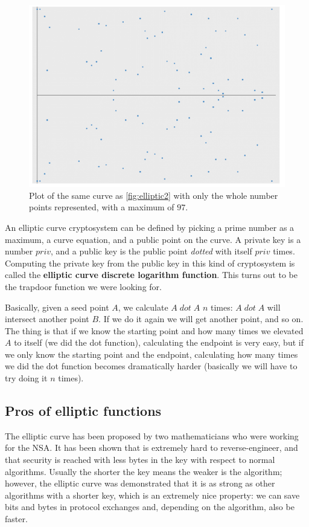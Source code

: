 \begin{figure}[H]
    \centering
    \includegraphics[scale=1]{img/elliptic3.png}
    \decoRule
    \caption{Plot of the same curve as \ref{fig:elliptic2} with only the whole number points represented, with a maximum of $97$.}
    \label{fig:elliptic3}
\end{figure}

An elliptic curve cryptosystem can be defined by picking a prime number as a maximum, a curve equation, and a public point on the curve. A private key is a number $priv$, and a public key is the public point \textit{dotted} with itself $priv$ times. Computing the private key from the public key in this kind of cryptosystem is called the \textbf{elliptic curve discrete logarithm function}. This turns out to be the trapdoor function we were looking for.

Basically, given a seed point $A$, we calculate $A\; dot\; A$ $n$ times: $A\; dot\; A$ will intersect another point $B$. If we do it again we will get another point, and so on. The thing is that if we know the starting point and how many times we elevated $A$ to itself (we did the dot function), calculating the endpoint is very easy, but if we only know the starting point and the endpoint, calculating how many times we did the dot function becomes dramatically harder (basically we will have to try doing it $n$ times).


\subsection*{Pros of elliptic functions}
The elliptic curve has been proposed by two mathematicians who were working for the NSA. It has been shown that is extremely hard to reverse-engineer, and that security is reached with less bytes in the key with respect to normal algorithms. Usually the shorter the key means the weaker is the algorithm; however, the elliptic curve was demonstrated that it is as strong as other algorithms with a shorter key, which is an extremely nice property: we can save bits and bytes in protocol exchanges and, depending on the algorithm, also be faster.

